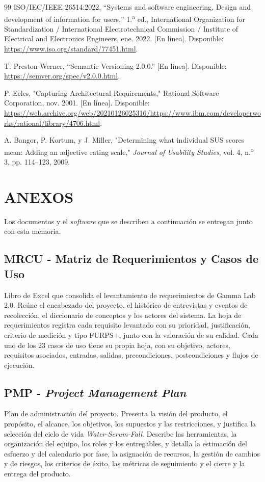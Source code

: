 \documentclass[12pt,letterpaper,oneside]{article}
\newcommand{\capitulo}[1]{\clearpage\section{#1}}
\begin{document}
\begin{thebibliography}{99}
 ISO/IEC/IEEE 26514:2022, ``Systems and software engineering, Design and development of information for users,'' 1.\textsuperscript{a} ed., International Organization for Standardization / International Electrotechnical Commission / Institute of Electrical and Electronics Engineers, ene. 2022. [En línea]. Disponible: \url{https://www.iso.org/standard/77451.html}.

 T. Preston-Werner, ``Semantic Versioning 2.0.0.'' [En línea]. Disponible: \url{https://semver.org/spec/v2.0.0.html}.

 P. Eeles, "Capturing Architectural Requirements," Rational Software Corporation, nov. 2001. [En línea]. Disponible: \url{https://web.archive.org/web/20210126025316/https://www.ibm.com/developerworks/rational/library/4706.html}.

 A. Bangor, P. Kortum, y J. Miller, "Determining what individual SUS scores mean: Adding an adjective rating scale," \textit{Journal of Usability Studies}, vol. 4, n.\textsuperscript{o} 3, pp. 114--123, 2009.

\end{thebibliography}
\endgroup

\capitulo{ANEXOS}

Los documentos y el \textit{software} que se describen a continuación se entregan junto con esta memoria.

\subsection{MRCU - Matriz de Requerimientos y Casos de Uso}
\label{anx:mrcu}
Libro de Excel que consolida el levantamiento de requerimientos de Gamma Lab 2.0. Reúne el encabezado del proyecto, el histórico de entrevistas y eventos de recolección, el diccionario de conceptos y los actores del sistema. La hoja de requerimientos registra cada requisito levantado con su prioridad, justificación, criterio de medición y tipo FURPS+, junto con la valoración de su calidad. Cada uno de los 23 casos de uso tiene su propia hoja, con su objetivo, actores, requisitos asociados, entradas, salidas, precondiciones, postcondiciones y flujos de ejecución.

\subsection{PMP - \textit{Project Management Plan}}
\label{anx:pmp}
Plan de administración del proyecto. Presenta la visión del producto, el propósito, el alcance, los objetivos, los supuestos y las restricciones, y justifica la selección del ciclo de vida \textit{Water-Scrum-Fall}. Describe las herramientas, la organización del equipo, los roles y los entregables, y detalla la estimación del esfuerzo y del calendario por fase, la asignación de recursos, la gestión de cambios y de riesgos, los criterios de éxito, las métricas de seguimiento y el cierre y la entrega del producto.
\end{document}
